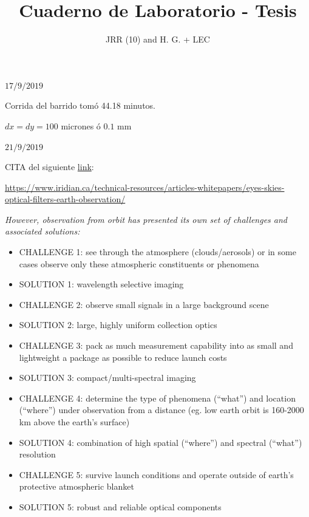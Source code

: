 \documentclass[12pt,dvipsnames]{exam}
\begin{document}
\title{Cuaderno de Laboratorio - Tesis}
\author{JRR (10) and H. G. + LEC}
\maketitle






$17/9/2019$

Corrida del barrido tomó 44.18 minutos.

$dx = dy = 100$ micrones ó $0$.$1$ mm


\hrulefill


$21/9/2019$

CITA del siguiente \href{https://www.iridian.ca/technical-resources/articles-whitepapers/eyes-skies-optical-filters-earth-observation/}{link}:

\url{https://www.iridian.ca/technical-resources/articles-whitepapers/eyes-skies-optical-filters-earth-observation/}

\textit{However, observation from orbit has presented its own set of challenges and associated solutions:}

\begin{itemize}
\item CHALLENGE 1: see through the atmosphere (clouds/aerosols) or in some cases observe only these atmospheric constituents or phenomena
\item SOLUTION 1: wavelength selective imaging
\item CHALLENGE 2: observe small signals in a large background scene
\item SOLUTION 2: large, highly uniform collection optics
\item CHALLENGE 3: pack as much measurement capability into as small and lightweight a package as possible to reduce launch costs
\item SOLUTION 3: compact/multi-spectral imaging
\item CHALLENGE 4: determine the type of phenomena (“what”) and location (“where”) under observation from a distance (eg. low earth orbit is 160-2000 km above the earth’s surface)
\item SOLUTION 4: combination of high spatial (“where”) and spectral (“what”) resolution
\item CHALLENGE 5: survive launch conditions and operate outside of earth’s protective atmospheric blanket
\item SOLUTION 5: robust and reliable optical components
\end{itemize}
\end{document}
